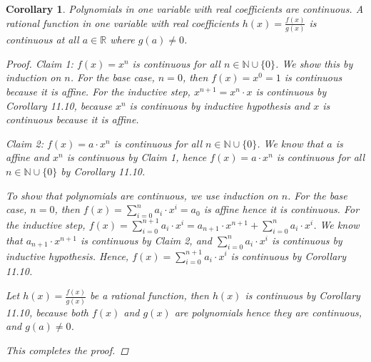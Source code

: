 \documentclass[11pt]{article}
\newcommand{\bbN}{\mathbb{N}}
\newcommand{\bbR}{\mathbb{R}}
\renewcommand{\_}[1]{\underline{ #1 }}
\newtheorem{corollary}[theorem]{Corollary}
\theoremstyle{definition}
\numberwithin{equation}{subsection}
\begin{document}
\begin{corollary}
	Polynomials in one variable with real coefficients are continuous. A rational function in one variable with real coefficients $h(x) = \frac{f(x)}{g(x)}$ is continuous at all $a \in \bbR$ where $g(a) \neq 0$.
        
\begin{proof}
Claim 1: $f(x)=x^n$ is continuous for all $n \in \bbN \cup \{0\}$. We show this by induction on $n$. For the base case, $n=0$, then $f(x)=x^0=1$ is continuous because it is affine. For the inductive step, $x^{n+1}=x^n\cdot x$ is continuous by Corollary 11.10, because $x^n$ is continuous by inductive hypothesis and $x$ is continuous because it is affine.

Claim 2: $f(x)=a\cdot x^n$ is continuous for all $n \in \bbN \cup \{0\}$. We know that $a$ is affine and $x^n$ is continuous by Claim 1, hence $f(x)=a\cdot x^n$ is continuous for all $n \in \bbN \cup \{0\}$ by Corollary 11.10.

To show that polynomials are continuous, we use induction on $n$. For the base case, $n=0$, then $f(x)=\sum_{i=0}^{n} a_i\cdot x^i=a_0$ is affine hence it is continuous. For the inductive step, $f(x)=\sum_{i=0}^{n+1} a_i\cdot x^i=a_{n+1}\cdot x^{n+1} + \sum_{i=0}^{n} a_i\cdot x^i$. We know that $a_{n+1}\cdot x^{n+1}$ is continuous by Claim 2, and $\sum_{i=0}^{n} a_i\cdot x^i$ is continuous by inductive hypothesis. Hence, $f(x)=\sum_{i=0}^{n+1} a_i\cdot x^i$ is continuous by Corollary 11.10.

Let $h(x)=\frac{f(x)}{g(x)}$ be a rational function, then $h(x)$ is continuous by Corollary 11.10, because both $f(x)$ and $g(x)$ are polynomials hence they are continuous, and $g(a)\neq 0$. 

This completes the proof.

\renewcommand\qedsymbol{QED}
\end{proof}


\end{corollary} 
\end{document}
